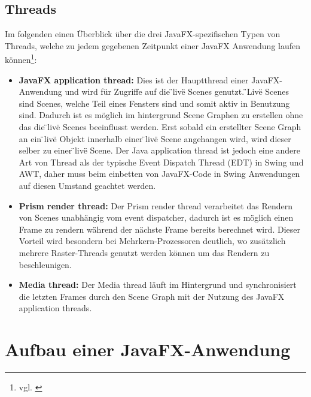 \subsection{Threads}

Im folgenden einen Überblick über die drei JavaFX-spezifischen Typen von Threads, welche zu jedem gegebenen Zeitpunkt einer JavaFX Anwendung laufen können\footnote{vgl. \cite{javafxarchitecture}}:

\begin{itemize}
	\item \textbf{JavaFX application thread:} Dies ist der Hauptthread einer JavaFX-Anwendung und wird für Zugriffe auf die \"{}live\"{} Scenes genutzt. \"{}Live\"{} Scenes sind Scenes, welche Teil eines Fensters sind und somit aktiv in Benutzung sind. Dadurch ist es möglich im hintergrund Scene Graphen zu erstellen ohne das die \"{}live\"{} Scenes beeinflusst werden. Erst sobald ein erstellter Scene Graph an ein \"{}live\"{} Objekt innerhalb einer \"{}live\"{} Scene angehangen wird, wird dieser selber zu einer \"{}live\"{} Scene. Der Java application thread ist jedoch eine andere Art von Thread als der typische Event Dispatch Thread (EDT) in Swing und AWT, daher muss beim einbetten von JavaFX-Code in Swing Anwendungen auf diesen Umstand geachtet werden.
	\item \textbf{Prism render thread:} Der Prism render thread verarbeitet das Rendern von Scenes unabhängig vom event dispatcher, dadurch ist es möglich einen Frame zu rendern während der nächste Frame bereits berechnet wird. Dieser Vorteil wird besondern bei Mehrkern-Prozessoren deutlich, wo zusätzlich mehrere Raster-Threads genutzt werden können um das Rendern zu beschleunigen.
	\item \textbf{Media thread:} Der Media thread läuft im Hintergrund und synchronisiert die letzten Frames durch den Scene Graph mit der Nutzung des JavaFX application threads.
\end{itemize}


\section{Aufbau einer JavaFX-Anwendung}

